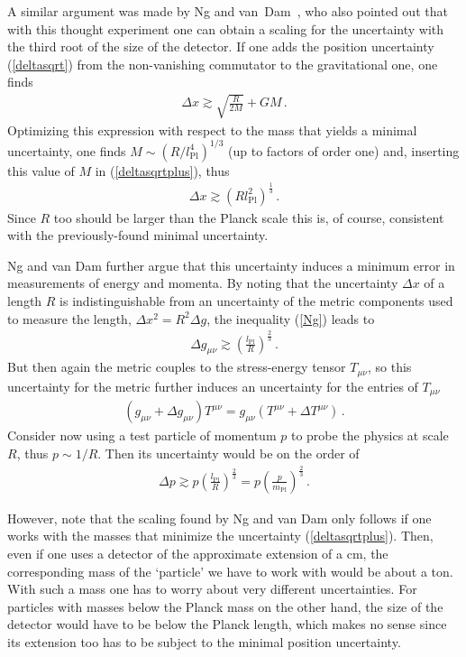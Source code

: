 \documentclass{article}
\def\beqn{\begin{eqnarray}}
\def\eeqn{\end{eqnarray}}
\begin{document}
A similar argument was made by Ng and van~Dam~\cite{Ng:1994zk}, who also pointed out
that with this thought experiment one can obtain a scaling for the uncertainty 
with the third root of the size of the detector. If one adds the position uncertainty
(\ref{deltasqrt}) from the non-vanishing commutator to the gravitational one, one
finds
\beqn
\Delta x \gtrsim \sqrt{\frac{R}{2M}} + G M \,. \label{deltasqrtplus}
\eeqn 
Optimizing this expression with respect to the mass that yields a minimal uncertainty, one finds $M \sim (R/l_{\mathrm{Pl}}^4)^{1/3}$ (up to
factors of order one) and, inserting this value of $M$ in (\ref{deltasqrtplus}), thus
\beqn
\Delta x \gtrsim \left( R l_{\mathrm{Pl}}^2 \right)^{\frac{1}{3}} \,. \label{Ng}
\eeqn
Since $R$ too should be larger than the Planck scale this is, of course, consistent with the
previously-found minimal uncertainty. 

Ng and van Dam further argue that this uncertainty induces a minimum error in measurements
of energy and momenta. By noting that the uncertainty $\Delta x$ of a length $R$ is indistinguishable
from an uncertainty of the metric components used to measure the length, $\Delta x^2 = R^2 \Delta g$, 
the inequality (\ref{Ng}) leads to
\beqn
\Delta g_{\mu\nu} \gtrsim \left( \frac{l_{\mathrm{Pl}}}{R} \right)^{\frac{2}{3}} \,.
\eeqn
But then again the metric couples to the stress-energy tensor $T_{\mu \nu}$, so this 
uncertainty for the metric further induces an uncertainty for the entries of $T_{\mu\nu}$
\beqn
( g_{\mu \nu} + \Delta g_{\mu \nu}) T^{\mu \nu} = g_{\mu \nu} ( T^{\mu \nu} + \Delta T^{\mu \nu} )\,. 
\eeqn 
Consider now using a test particle of momentum $p$ to probe the physics at scale $R$, 
thus $p \sim 1/R$. Then its uncertainty would be on the order of
\beqn
\Delta p \gtrsim p \left( \frac{l_{\mathrm{Pl}}}{R} \right)^{\frac{2}{3}} = p \left( \frac{p}{m_{\mathrm{Pl}}} \right)^{\frac{2}{3}} \,.
\eeqn

However, note that the scaling found by Ng and van Dam only follows if one
works with the masses that minimize the uncertainty (\ref{deltasqrtplus}). Then, even if one uses a 
detector of the approximate
extension of a cm, the corresponding mass of the `particle' we have to work with would be about a ton. 
With such a mass one has to worry about very different uncertainties. For particles with masses
below the Planck mass on the other hand, the size of the detector would have to be below the 
Planck length, which makes no sense since its extension too has to be subject to the minimal 
position uncertainty.
\end{document}
